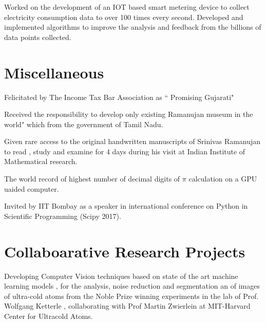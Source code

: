 \documentclass[]{deedy-resume-openfont}
\begin{document}
\sectionsep

Worked on the development of an IOT based smart metering device to collect electricity consumption data to over 100 times every second. Developed and implemented algorithms to improve the analysis and feedback from the billions of data points collected.

\sectionsep



\section{Miscellaneous}
\hline
\vspace{\topsep}

\begin{tightemize}
\item Felicitated by The Income Tax Bar Association as “ Promising Gujarati"
\item Received the responsibility to develop \The only existing Ramanujan museum
in the world" which from the government of Tamil Nadu.
\item Given rare access to the original handwritten manuscripts of Srinivas Ramanujan to read , study and examine for 4 days during his visit at Indian Institute of Mathematical research.
\item The world record of highest number of decimal digits of $\pi$ calculation on a GPU uaided computer. 
\item Invited by IIT Bombay as a speaker in international conference on Python in Scientific Programming (Scipy 2017).
\end{tightemize}
\sectionsep








\section{Collaboarative Research Projects}
\hline
\vspace{\topsep}


Developing Computer Vision techniques based on state of the art machine learning models , for the analysis, noise reduction and segmentation an of images of ultra-cold atoms from the Noble Prize winning experiments in the lab of Prof.  Wolfgang Ketterle , collaborating with Prof Martin Zwierlein at MIT-Harvard Center for Ultracold Atoms.
\end{document}
